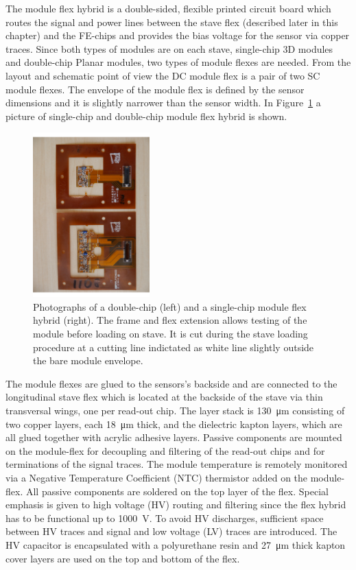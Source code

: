 The module flex hybrid is a double-sided, flexible printed circuit board which routes the signal and power lines between the stave flex (described later in this chapter) and the FE-chips and provides the bias voltage for the sensor via copper traces. Since both types of modules are on each stave, single-chip 3D modules and double-chip Planar modules, two types of module flexes are needed. From the layout and schematic point of view the DC module flex is a pair of two SC module flexes. The envelope of the module flex is defined by the sensor dimensions and it is slightly narrower than the sensor width. In Figure~\ref{fig:module_flexes} a picture of single-chip and double-chip module flex hybrid is shown.

\begin{figure}
\centering
\includegraphics[width=0.4\textwidth, angle=270]{Images/ibl_paper/chapter04_Modules/module_flexes.pdf}
\caption{Photographs of a double-chip (left) and a single-chip module flex hybrid (right). The frame and flex extension allows testing of the module before loading on stave. It is cut during the stave loading procedure at a cutting line indictated as white line slightly outside the bare module envelope.}
\label{fig:module_flexes}
\end{figure}

The module flexes are glued to the sensors's backside and are connected to the longitudinal stave flex which is located at the backside of the stave via thin transversal wings, one per read-out chip. The layer stack is \SI{130}{\micro\meter} consisting of two copper layers, each \SI{18}{\micro\meter} thick, and the dielectric kapton layers, which are all glued together with acrylic adhesive layers. Passive components are mounted on the module-flex for decoupling and filtering of the read-out chips and for terminations of the signal traces. The module temperature is remotely monitored via a Negative Temperature Coefficient (NTC) thermistor added on the module-flex. All passive components are soldered on the top layer of the flex. Special emphasis is given to high voltage (HV) routing and filtering since the flex hybrid has to be functional up to \SI{1000}{\volt}. To avoid HV discharges, sufficient space between HV traces and signal and low voltage (LV) traces are introduced. The HV capacitor is encapsulated with a polyurethane resin and \SI{27}{\micro\meter} thick kapton cover layers are used on the top and bottom of the flex.

